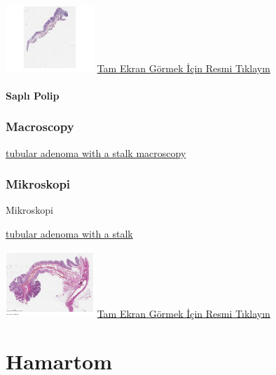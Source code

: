 \documentclass[
  letterpaper,
  DIV=11,
  numbers=noendperiod]{scrreprt}
\begin{document}
\href{https://images.patolojiatlasi.com/tubularadenoma-flat/HE2.html}{\includegraphics[width=0.25\textwidth,height=\textheight]{./screenshots/thumbnail_tubularadenoma-flat2.png}}
\href{https://images.patolojiatlasi.com/tubularadenoma-flat/HE2.html}{Tam
Ekran Görmek İçin Resmi Tıklayın}

\hypertarget{sec-sapli-polip}{%
\subsubsection{Saplı Polip}\label{sec-sapli-polip}}

\hypertarget{macroscopy}{%
\subsection{Macroscopy}\label{macroscopy}}

\href{https://images.patolojiatlasi.com/tubularadenoma/tubular-adenoma-with-stalk-macroscopy.png}{tubular
adenoma with a stalk macroscopy}

\hypertarget{mikroskopi}{%
\subsection{Mikroskopi}\label{mikroskopi}}

Mikroskopi

\href{https://images.patolojiatlasi.com/tubularadenoma/tubular-adenoma-with-stalk.png}{tubular
adenoma with a stalk}

\href{https://images.patolojiatlasi.com/tubularadenoma/tubular-adenoma-with-stalk/viewer_z0.html}{\includegraphics[width=0.25\textwidth,height=\textheight]{./screenshots/thumbnail_tubular-adenoma-with-stalk.png}}
\href{https://images.patolojiatlasi.com/tubularadenoma/tubular-adenoma-with-stalk/viewer_z0.html}{Tam
Ekran Görmek İçin Resmi Tıklayın}

\hypertarget{sec-hamartom}{%
\chapter{Hamartom}\label{sec-hamartom}}
\end{document}

